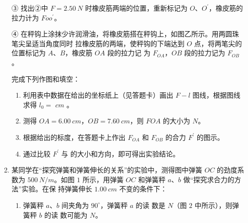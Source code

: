 \begin{enumerate}
③ 找出②中 $ F=2.50 \ N $ 时橡皮筋两端的位置，重新标记为 $ O $、$ O ^{\prime} $，橡皮筋的拉力计为 $ Foo ^{\prime} $。



④ 在秤钩上涂抹少许润滑油，将橡皮筋搭在秤钩上，如图乙所示。用两圆珠笔尖呈适当角度同时
拉橡皮筋的两端，使秤钩的下端达到 $ O $ 点，将两笔尖的位置标记为 $ A $、$ B $，橡皮筋 $ OA $ 段的拉力记
为 $ F_{OA} $，$ OB $ 段的拉力记为 $ F_{OB} $。


完成下列作图和填空：
\begin{enumerate}
\renewcommand{\labelenumi}{\arabic{enumi}.}
\item
利用表中数据在给出的坐标纸上（见答题卡）画出 $ F-l $ 图线，根据图线求得 $ l_{0}= $  $ cm $ 。

\item 
测得 $ OA=6.00 \ cm $，$ OB=7.60 \ cm $，则 $ FOA $ 的大小为
$ N $。

\item 
根据给出的标度，在答题卡上作出 $ F_{OA} $ 和 $ F_{OB} $ 的合力 $ F ^{\prime} $ 的图示。
\banswer{
  
}


\item 
通过比较 $ F ^{\prime} $ 与
的大小和方向，即可得出实验结论。




\end{enumerate}


\banswer{

}


\newpage
\item 
{}
某同学在“探究弹簧和弹簧伸长的关系”的实验中，测得图中弹簧 $ OC $
的劲度系数为 $ 500 \ N/m $。如图 $ 1 $ 所示，用弹簧 $ OC $ 和弹簧秤 $ a $、$ b $ 做“探究求合力的方法”实验。在保
持弹簧伸长 $ 1.00 \ cm $ 不变的条件下：
\begin{figure}[h!]
\centering

\end{figure}
\begin{enumerate}
\renewcommand{\labelenumi}{\arabic{enumi}.}
\item
弹簧秤 $ a $、$ b $ 间夹角为 $ 90 ^{ \circ } $，弹簧秤 $ a $ 的读
数是  $ N $（图 $ 2 $ 中所示），则弹簧秤 $ b $ 的读
数可能为  $ N $。


\end{enumerate}
\end{enumerate}
